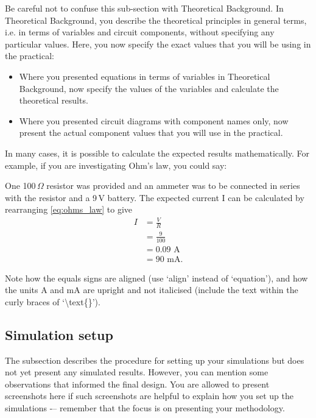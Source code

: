 \documentclass[a4paper, onecolumn, 12pt]{IEEEtran}
\begin{document}
Be careful not to confuse this sub-section with Theoretical Background. In Theoretical Background, you describe the theoretical principles in general terms, i.e. in terms of variables and circuit components, without specifying any particular values. Here, you now specify the exact values that you will be using in the practical:
\begin{itemize}
    \item Where you presented equations in terms of variables in Theoretical Background, now specify the values of the variables and calculate the theoretical results.
    \item Where you presented circuit diagrams with component names only, now present the actual component values that you will use in the practical.
\end{itemize}
In many cases, it is possible to calculate the expected results mathematically. For example, if you are investigating Ohm's law, you could say:

One 100\,$\Omega$ resistor was provided and an ammeter was to be connected in series with the resistor and a 9\,V battery. The expected current I can be calculated by rearranging \ref{eq:ohms_law} to give
\begin{align}
    I   &= \frac{V}{R} \label{eq:ohm_rearranged} \\
        &= \frac{9}{100} \label{eq:calc_current} \\
        &= 0.09 \text{ A} \label{eq:current_amp} \\
        &= 90 \text{ mA.} \label{eq:current_mA}
\end{align}

Note how the equals signs are aligned (use `align' instead of `equation'), and how the units A and mA are upright and not italicised (include the text within the curly braces of `\textbackslash text\{\}').

\subsection{Simulation setup}
\label{sec:sim_setup}

The subsection describes the procedure for setting up your simulations but does not yet present any simulated results. However, you can mention some observations that informed the final design. You are allowed to present screenshots here if such screenshots are helpful to explain how you set up the simulations -– remember that the focus is on presenting your methodology.
\end{document}
